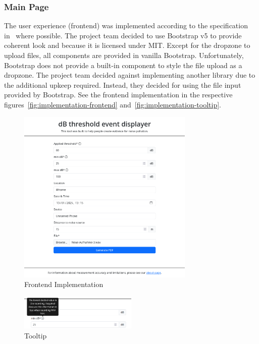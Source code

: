 \subsubsection{Main Page}\label{subsubsec:main-page}
The user experience (frontend) was implemented according to the specification in~ where possible.
The project team decided to use Bootstrap v5 to provide coherent look and because it is licensed under MIT. Except for the dropzone to upload files,
all components are provided in vanilla Bootstrap. Unfortunately, Bootstrap does not provide a built-in component to style the file upload as a dropzone.
The project team decided against implementing another library due to the additional upkeep required. Instead, they decided for using the file input provided by Bootstrap.
See the frontend implementation in the respective figures~\autoref{fig:implementation-frontend} and~\autoref{fig:implementation-tooltip}.
\begin{figure}[H]
    \centering
    \includegraphics[width=0.75\textwidth]{../assets/implementation_form.png}
    \caption{Frontend Implementation}\label{fig:implementation-frontend}
\end{figure}
\begin{figure}[H]
    \centering
    \includegraphics[width=0.5\textwidth]{../assets/implementation_tooltip.png}
    \caption{Tooltip}\label{fig:implementation-tooltip}
\end{figure}

